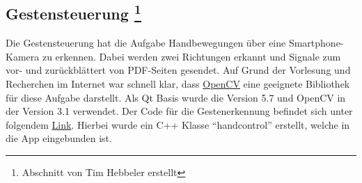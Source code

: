 \subsection[Gestensteuerung]{Gestensteuerung \footnote{Abschnitt von Tim Hebbeler erstellt}}
\thispagestyle{fancy}

Die Gestensteuerung hat die Aufgabe Handbewegungen über eine Smartphone-Kamera zu erkennen. Dabei werden zwei Richtungen erkannt und Signale zum vor- und zurückblättert von PDF-Seiten gesendet. Auf Grund der Vorlesung und Recherchen im Internet war schnell klar, dass \href{http://opencv.org/}{OpenCV} eine geeignete  Bibliothek für diese Aufgabe darstellt. Als Qt Basis wurde die Version 5.7 und OpenCV in der Version 3.1 verwendet. Der Code für die Gestenerkennung befindet sich unter folgendem \href{https://github.com/BeckmaR/EmbeddedMultimediaSS2016/tree/master/src/handcontrol}{Link}. Hierbei wurde ein C++ Klasse "`handcontrol"' erstellt, welche in die App eingebunden ist.

